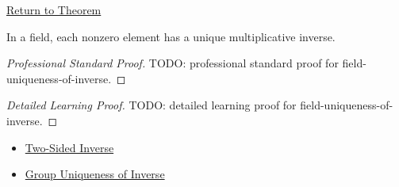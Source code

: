 \newpage
{}
\label{prf:field-uniqueness-of-inverse}

\begin{remark*}[Return]
\hyperref[thm:field-uniqueness-of-inverse]{Return to Theorem}
\end{remark*}

\begin{theorem*}
In a field, each nonzero element has a unique multiplicative inverse.
\end{theorem*}

\begin{proof}[Professional Standard Proof]
\LRAProofBodyStart
TODO: professional standard proof for field-uniqueness-of-inverse.
\end{proof}

\begin{proof}[Detailed Learning Proof]
\LRAProofBodyStart
TODO: detailed learning proof for field-uniqueness-of-inverse.
\end{proof}

\begin{remark*}
\end{remark*}

\begin{dependencies}
\begin{itemize}
  \item \hyperref[def:two-sided-inverse]{Two-Sided Inverse}
  \item \hyperref[thm:group-uniqueness-of-inverse]{Group Uniqueness of Inverse}
\end{itemize}
\end{dependencies}

\clearpage
